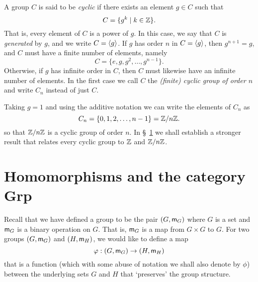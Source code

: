 \begin{example}
    A group \(C\) is said to be \emph{cyclic} if there exists an element \(g \in
    C\) such that
    \[
        C = \{g^k \mid k \in \mathbb{Z}\}.
    \]
    That is, every element of \(C\) is a power of \(g\). In this case, we say
    that \(C\) is \emph{generated} by \(g\), and we write \(C = \langle g \rangle\). If
    \(g\) has order \(n\) in \(C = \langle g \rangle\), then \(g^{n+1} = g\), and \(C\)
    must have a finite number of elements, namely
    \[
        C = \{e, g, g^2, \ldots, g^{n - 1}\}.
    \]
    Otherwise, if \(g\) has infinite order in \(C\), then \(C\) must likewise
    have an infinite number of elements. In the first case we call \(C\) the
    \emph{(finite) cyclic group of order \(n\)} and write \(C_n\) instead of
    just \(C\).

    Taking \(g = 1\) and using the additive notation we can write the elements
    of \(C_n\) as
    \[
        C_n = \{0, 1, 2, \ldots, n - 1\} = \mathbb{Z}/n\mathbb{Z}.
    \]
    so that \(\mathbb{Z}/n\mathbb{Z}\) is a cyclic group of order \(n\). In
    \S~\ref{sec:homomorphisms-grp} we shall establish a stronger result that
    relates every cyclic group to \(\mathbb{Z}\) and \(\mathbb{Z}/n\mathbb{Z}\).
\end{example}

\section{Homomorphisms and the category {\normalfont\sffamily Grp}}
\label{sec:homomorphisms-grp}

Recall that we have defined a group to be the pair \((G, {\mathsf{m}}_G)\) where \(G\)
is a set and \({\mathsf{m}}_G\) is a binary operation on \(G\). That is, \({\mathsf{m}}_G\) is
a map from \(G \times G\) to \(G\). For two groups \((G, {\mathsf{m}}_G)\) and \((H,
{\mathsf{m}}_H)\), we would like to define a map
\[
    \varphi: (G, {\mathsf{m}}_G) \to (H, {\mathsf{m}}_H)
\]
that is a function (which with some abuse of notation we shall also denote by
\(\phi\)) between the underlying sets \(G\) and \(H\) that `preserves' the group
structure.

